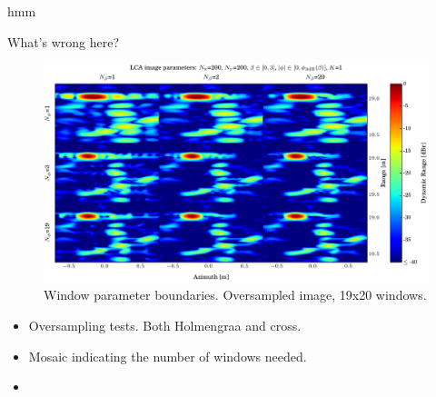 \documentclass[10pt,journal,draftclsnofoot,onecolumn]{IEEEtran}
\let\MYoriglatexcaption\caption               %
\renewcommand{\caption}[2][\relax]{\MYoriglatexcaption[#2]{#2}}
\newcommand\1{\vec 1}
\begin{document}
\newpage


hmm 

\newpage

What's wrong here? 

\begin{figure}[tbhp!]%
\includegraphics[width=\textwidth]{gfx/oversampling_mosaic.pdf}%
\caption{Window parameter boundaries. Oversampled image, 19x20 windows.}\label{oversampling_mosaic}
\end{figure}


\begin{itemize}
\item Oversampling tests. Both Holmengraa and cross.
\item Mosaic indicating the number of windows needed.
\item 
\end{itemize}



\end{document}
